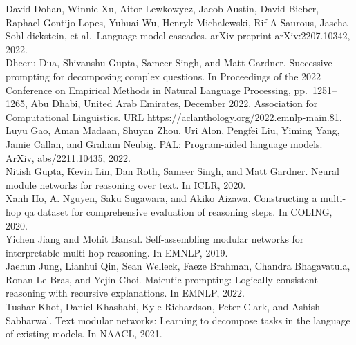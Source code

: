 \documentclass[
]{article}
\begin{document}
David Dohan, Winnie Xu, Aitor Lewkowycz, Jacob Austin, David Bieber,
Raphael Gontijo Lopes, Yuhuai Wu, Henryk Michalewski, Rif A Saurous,
Jascha Sohl-dickstein, et al.~Language model cascades. arXiv preprint
arXiv:2207.10342, 2022.\\
Dheeru Dua, Shivanshu Gupta, Sameer Singh, and Matt Gardner. Successive
prompting for decomposing complex questions. In Proceedings of the 2022
Conference on Empirical Methods in Natural Language Processing,
pp.~1251--1265, Abu Dhabi, United Arab Emirates, December 2022.
Association for Computational Linguistics. URL
https://aclanthology.org/2022.emnlp-main.81.\\
Luyu Gao, Aman Madaan, Shuyan Zhou, Uri Alon, Pengfei Liu, Yiming Yang,
Jamie Callan, and Graham Neubig. PAL: Program-aided language models.
ArXiv, abs/2211.10435, 2022.\\
Nitish Gupta, Kevin Lin, Dan Roth, Sameer Singh, and Matt Gardner.
Neural module networks for reasoning over text. In ICLR, 2020.\\
Xanh Ho, A. Nguyen, Saku Sugawara, and Akiko Aizawa. Constructing a
multi-hop qa dataset for comprehensive evaluation of reasoning steps. In
COLING, 2020.\\
Yichen Jiang and Mohit Bansal. Self-assembling modular networks for
interpretable multi-hop reasoning. In EMNLP, 2019.\\
Jaehun Jung, Lianhui Qin, Sean Welleck, Faeze Brahman, Chandra
Bhagavatula, Ronan Le Bras, and Yejin Choi. Maieutic prompting:
Logically consistent reasoning with recursive explanations. In EMNLP,
2022.\\
Tushar Khot, Daniel Khashabi, Kyle Richardson, Peter Clark, and Ashish
Sabharwal. Text modular networks: Learning to decompose tasks in the
language of existing models. In NAACL, 2021.
\end{document}
